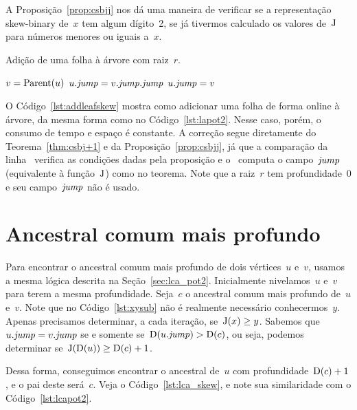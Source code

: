 \documentclass[main.tex]{subfiles}
\begin{document}
A Proposição~\ref{prop:csbjj} nos dá uma maneira de verificar se a representação skew-binary de~$x$ tem algum dígito~2, se já tivermos calculado os valores de~$\operatorname{J}$ para números menores ou iguais a~$x$.

\renewcommand{\root}{\mathit{root}}
\begin{algorithm}[h]
\caption{Adição de uma folha à árvore com raiz~$r$.} \label{lst:addleafskew}
\begin{algorithmic}[1]
		\State $v = \operatorname{Parent}(u)$
		 \label{lst:addleafskew:if}
			\State $u.\mathit{jump} = v.\mathit{jump}.\mathit{jump}$
		\Else
			\State $u.\mathit{jump} = v$
		\EndIf
	\EndFunction
\end{algorithmic}
\end{algorithm}

O Código~\ref{lst:addleafskew} mostra como adicionar uma folha de forma online à árvore, da mesma forma como no Código~\ref{lst:lapot2}. Nesse caso, porém, o consumo de tempo e espaço é constante. A correção segue diretamente do Teorema~\ref{thm:csbj+1} e da Proposição~\ref{prop:csbjj}, já que a comparação da linha~ verifica as condições dadas pela proposição e o~ computa o campo~$\mathit{jump}$ (equivalente à função~$\operatorname{J}$) como no teorema. Note que a raiz~$r$ tem profundidade~0 e seu campo~$\mathit{jump}$ não é usado.

\section{Ancestral comum mais profundo}

Para encontrar o ancestral comum mais profundo de dois vértices~$u$ e~$v$, usamos a mesma lógica descrita na Seção~\ref{sec:lca_pot2}. Inicialmente nivelamos~$u$ e~$v$ para terem a mesma profundidade. Seja~$c$ o ancestral comum mais profundo de~$u$ e~$v$. Note que no Código~\ref{lst:xysub} não é realmente necessário conhecermos~$y$. Apenas precisamos determinar, a cada iteração, se~$\operatorname{J}(x) \geq y$. Sabemos que~${u.\mathit{jump} = v.\mathit{jump}}$ se e somente se~${\operatorname{D}(u.\mathit{jump}) > \operatorname{D}(c)}$, ou seja, podemos determinar se~${\operatorname{J}(\operatorname{D}(u)) \geq \operatorname{D}(c) + 1}$.

Dessa forma, conseguimos encontrar o ancestral de~$u$ com profundidade~$\operatorname{D}(c) + 1$, e o pai deste será~$c$. Veja o Código~\ref{lst:lca_skew}, e note sua similaridade com o Código~\ref{lst:lcapot2}.
\end{document}
